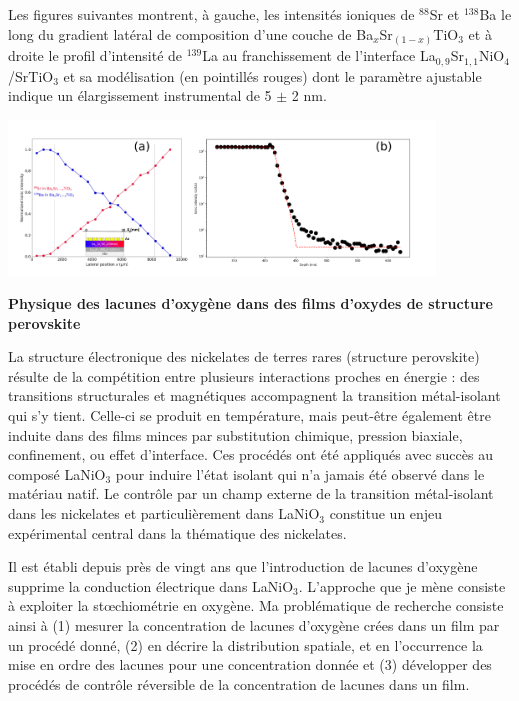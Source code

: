 Les figures suivantes montrent, à gauche, les intensités ioniques de $^{88}$Sr et $^{138}$Ba le long du gradient latéral de composition d’une couche de Ba$_x$Sr$_(1-x)$TiO$_3$ et à droite le profil d’intensité de $^{139}$La au franchissement de l’interface La$_{0,9}$Sr$_{1,1}$NiO$_4$/SrTiO$_3$ et sa modélisation (en pointillés rouges) dont le paramètre ajustable indique un élargissement instrumental de 5 $\pm$ 2 nm.
\par
\begin{center}
\includegraphics[width=0.85\textwidth]{./figures/SUPERNICKEL.png}
\end{center}







	\bigskip
	\textbf{\textsf{Physique des lacunes d'oxygène dans des films d'oxydes de structure perovskite}}

La structure électronique des nickelates de terres rares (structure perovskite) résulte de la compétition entre plusieurs interactions proches en énergie : des transitions structurales et magnétiques accompagnent la transition métal-isolant qui s'y tient.
Celle-ci se produit en température, mais peut-être également être induite dans des films minces par substitution chimique, pression biaxiale, confinement, ou effet d'interface. Ces procédés ont été appliqués avec succès au composé LaNiO$_3$ pour induire l'état isolant qui n'a jamais été observé dans le matériau natif. Le contrôle par un champ externe de la transition métal-isolant dans les nickelates et particulièrement dans LaNiO$_3$ constitue un enjeu expérimental central dans la thématique des nickelates.

Il est établi depuis près de vingt ans que l'introduction de lacunes d'oxygène supprime la conduction électrique dans LaNiO$_3$. 
L'approche que je mène consiste à exploiter la st\oe chiométrie en oxygène. Ma problématique de recherche consiste ainsi à (1) mesurer la concentration de lacunes d'oxygène crées dans un film par un procédé donné, (2) en décrire la distribution spatiale, et en l'occurrence la mise en ordre des lacunes pour une concentration donnée et (3) développer des procédés de contrôle réversible de la concentration de lacunes dans un film.

